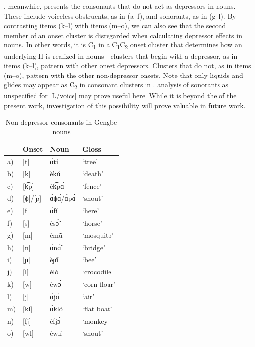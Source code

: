 \documentclass[output=paper
,newtxmath
,modfonts
,nonflat]{langsci/langscibook}
\begin{document}
, meanwhile, presents the consonants that do not act as depressors in  nouns. These include voiceless obstruents, as in (a–f), and sonorants, as in (g–l). By contrasting  items (k–l) with  items (m–o), we can also see that the second member of an onset cluster is disregarded when calculating depressor effects in nouns. In other words, it is C\textsubscript{1} in a C\textsubscript{1}C\textsubscript{2} onset cluster that determines how an underlying H is realized in  nouns—clusters that begin with a depressor, as in  items (k–l), pattern with other onset depressors. Clusters that do not, as in  items (m–o), pattern with the other non-depressor onsets. Note that only liquids and glides may appear as C\textsubscript{2} in consonant clusters in .  analysis of sonorants as unspecified for [L/voice] may prove useful here. While it is beyond the  of the present work, investigation of this possibility will prove valuable in future work.

\begin{table}
\begin{tabularx}{.66\textwidth}{lllX}
\lsptoprule
&  Onset &  Noun &  Gloss\\
\midrule
a) & [t]     & ɑ̀tí  &  {‘tree’}\\
b) & [k]     & èkú  &  {‘death’}\\
c) & [k͡p]    & èk͡pɑ́ &  {‘fence’} \\
d) & [ɸ]/[p] & ɑ̀ɸɑ́/ɑ̀pɑ́ &  {‘shout’}\\
e) & [f]     & ɑ̀fí  &  {‘here’}\\
f) & [s]     & èsɔ̃́  &  {‘horse’}\\
g) & [m]     & èmṹ  &  {‘mosquito’}\\
h) & [n]     & ɑ̀nɑ̃́  &  {‘bridge’}\\
i) & [ɲ]     & èɲĩ́  &  {‘bee’}\\
j) & [l]     & èló  &  {‘crocodile’}\\
k) & [w]     & èwɔ́  &  {‘corn flour’}\\
l) & [j]     & ɑ̀jɑ́  &  {‘air’}\\
m) & [kl]    & ɑ̀kló &  {‘flat boat’}\\
n) & [fj]    & èfjɔ́ &  {‘monkey}\\
o) & [wl]    & èwlí &  {‘shout’}\\
\lspbottomrule
\end{tabularx}
\caption{Non-depressor consonants in Gengbe nouns}
\label{tab:lotven:4}
\end{table}
\end{document}
